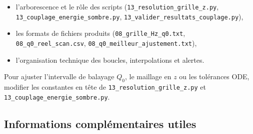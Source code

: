 \begin{itemize}
  \item l’arborescence et le rôle des scripts (\texttt{13\_resolution\_grille\_z.py}, \texttt{13\_couplage\_energie\_sombre.py}, \texttt{13\_valider\_resultats\_couplage.py}),  
  \item les formats de fichiers produits (\texttt{08\_grille\_Hz\_q0.txt}, \texttt{08\_q0\_reel\_scan.csv}, \texttt{08\_q0\_meilleur\_ajustement.txt}),  
  \item l’organisation technique des boucles, interpolations et alertes.
\end{itemize}

Pour ajuster l’intervalle de balayage \(Q_{0}\), le maillage en \(z\) ou les tolérances ODE, modifier les constantes en tête de \texttt{13\_resolution\_grille\_z.py} et \texttt{13\_couplage\_energie\_sombre.py}.  

\subsection{Informations complémentaires utiles}

